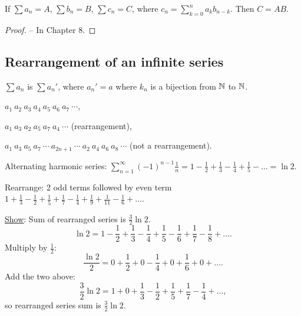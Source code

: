 \documentclass[]{article}
\begin{document}
\begin{theorem}
	\label{thm-3-51}
	If $\sum a_n = A$, $\sum b_n = B$, $\sum c_n=C$, where $c_n=\sum_{k=0}^n a_kb_{n-k}$.
	Then $C=AB$.
\end{theorem}
\begin{proof}
	-- In Chapter 8.
\end{proof}

\subsection*{Rearrangement of an infinite series}

$\sum a_n$ is $\sum a_n'$, where $a_n'=a$ where $k_n$ is a bijection from $\mathbb{N}$ to $\mathbb{N}$.
\begin{example}
	$a_1\ a_2\ a_3\ a_4\ a_5\ a_6\ a_7\ \cdots$, 
	
	$a_1\ a_3\ a_2\ a_5\ a_7\ a_4\ \cdots$ (rearrangement),
	
	$a_1\ a_3\ a_5\ a_7\ \cdots\ a_{2n+1}\ \cdots\ a_2\ a_4\ a_6\ a_8\ \cdots$ (not a rearrangement).
\end{example}
\begin{example}
	Alternating harmonic series: $\sum_{n=1}^\infty (-1)^{n-1}\frac1n = 1-\frac12+\frac13-\frac14+\frac15-\dots = \ln 2$.
	
	Rearrange: 2 odd terms followed by even term $1+\frac13-\frac12+\frac15+\frac17-\frac14+\frac19+\frac1{11}-\frac16+\dots$.
	
	\ul{\ul{Show}}: Sum of rearranged series is $\frac32\ln2$.
	$$\ln 2 = 1-\frac12+\frac13-\frac14+\frac15-\frac16+\frac17-\frac18+\dots.$$
	Multiply by $\frac12$:
	$$\frac{\ln2}{2} = 0+\frac12+0-\frac14+0+\frac16+0+\dots.$$
	Add the two above:
	$$ \frac32\ln2 = 1+0+\frac13-\frac12 + \frac15 + \frac17-\frac14+\dots,$$
	so rearranged series sum is $\frac32\ln 2$.
\end{example}
\end{document}
